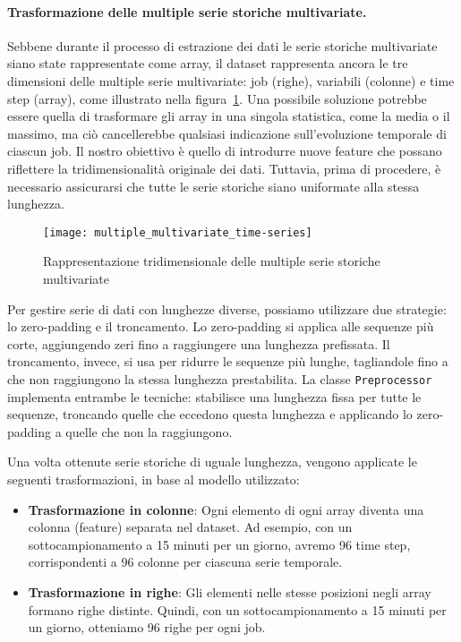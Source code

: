 \paragraph{Trasformazione delle multiple serie storiche multivariate.} Sebbene
durante il processo di estrazione dei dati le serie storiche multivariate
siano state rappresentate come array, il dataset rappresenta ancora le tre
dimensioni delle multiple serie multivariate: job (righe), variabili (colonne)
e time step (array), come illustrato nella
figura~\ref{fig:multiple_multivariate_time-series}. Una possibile soluzione
potrebbe essere quella di trasformare gli array in una singola statistica,
come la media o il massimo, ma ciò cancellerebbe qualsiasi indicazione
sull'evoluzione temporale di ciascun job. Il nostro obiettivo è quello di
introdurre nuove feature che possano riflettere la tridimensionalità originale
dei dati. Tuttavia, prima di procedere, è necessario assicurarsi che tutte le
serie storiche siano uniformate alla stessa lunghezza.

\begin{figure}[!ht]
   \centering
   \texttt{[image: multiple\_multivariate\_time-series]}
   \caption{Rappresentazione tridimensionale delle multiple serie storiche
   multivariate}
   \label{fig:multiple_multivariate_time-series}
\end{figure}

Per gestire serie di dati con lunghezze diverse, possiamo utilizzare due
strategie: lo zero-padding e il troncamento. Lo zero-padding si applica alle
sequenze più corte, aggiungendo zeri fino a raggiungere una lunghezza
prefissata. Il troncamento, invece, si usa per ridurre le sequenze più lunghe,
tagliandole fino a che non raggiungono la stessa lunghezza prestabilita. La
classe \texttt{Preprocessor} implementa entrambe le tecniche: stabilisce una
lunghezza fissa per tutte le sequenze, troncando quelle che eccedono questa
lunghezza e applicando lo zero-padding a quelle che non la raggiungono.

Una volta ottenute serie storiche di uguale lunghezza, vengono applicate le
seguenti trasformazioni, in base al modello utilizzato:

\begin{itemize}
    \item \textbf{Trasformazione in colonne}: Ogni elemento di ogni array
        diventa una colonna (feature) separata nel dataset. Ad esempio, con un
        sottocampionamento a 15 minuti per un giorno, avremo 96 time step,
        corrispondenti a 96 colonne per ciascuna serie temporale.
    \item \textbf{Trasformazione in righe}: Gli elementi nelle stesse
        posizioni negli array formano righe distinte. Quindi, con un
        sottocampionamento a 15 minuti per un giorno, otteniamo 96 righe per
        ogni job.
\end{itemize}

